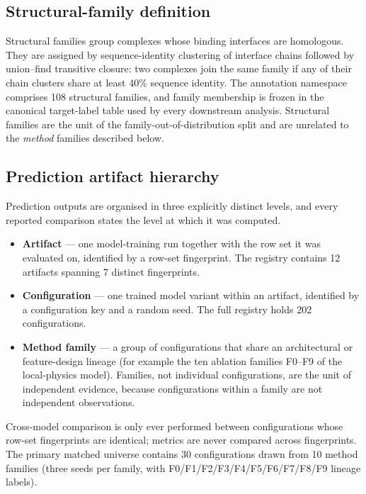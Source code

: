 \documentclass[11pt,a4paper]{article}
\begin{document}
\subsection*{Structural-family definition}
Structural families group complexes whose binding interfaces are homologous. They are
assigned by sequence-identity clustering of interface chains followed by union--find
transitive closure: two complexes join the same family if any of their chain clusters share
at least 40\% sequence identity. The annotation namespace comprises 108 structural families,
and family membership is frozen in the canonical target-label table used by every downstream
analysis. Structural families are the unit of the family-out-of-distribution split and are
unrelated to the \emph{method} families described below.

\subsection*{Prediction artifact hierarchy}
Prediction outputs are organised in three explicitly distinct levels, and every reported
comparison states the level at which it was computed.
\begin{itemize}
  \item \textbf{Artifact} --- one model-training run together with the row set it was
        evaluated on, identified by a row-set fingerprint. The registry contains 12
        artifacts spanning 7 distinct fingerprints.
  \item \textbf{Configuration} --- one trained model variant within an artifact, identified
        by a configuration key and a random seed. The full registry holds 202 configurations.
  \item \textbf{Method family} --- a group of configurations that share an architectural or
        feature-design lineage (for example the ten ablation families F0--F9 of the
        local-physics model). Families, not individual configurations, are the unit of
        independent evidence, because configurations within a family are not independent
        observations.
\end{itemize}
Cross-model comparison is only ever performed between configurations whose row-set
fingerprints are identical; metrics are never compared across fingerprints. The primary
matched universe contains 30 configurations drawn from 10 method families (three seeds per
family, with F0/F1/F2/F3/F4/F5/F6/F7/F8/F9 lineage labels).
\end{document}
